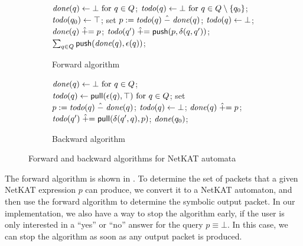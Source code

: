 \documentclass[acmsmall,dvipsnames,nonacm]{acmart}
\begin{document}
\newcommand{\pluseq}{\mathrel{\nf{+}}=}
\begin{figure}
    \begin{subfigure}[t]{0.49\textwidth}
    \begin{algorithmic}
    \State $\textit{done}(q) \gets \bot \text{ for } q \in Q$;
    \State $\textit{todo}(q) \gets \bot \text{ for } q \in Q \setminus \{q_0\}$;
    \State $\textit{todo}(q_0) \gets \top$;
        \State set $p := \textit{todo}(q) \mathrel{\hat{-}} \textit{done}(q)$;
        \State $\textit{todo}(q) \gets \bot$;
        \State $\doneR(q) \pluseq p$;
            \State $\todoR(q') \pluseq \mathsf{push}(p,\delta(q,q'))$;
          \EndFor
    \EndWhile
    \State
    \Return $\sum_{q \in Q} \mathsf{push}(\textit{done}(q), \epsilon(q))$;
    \end{algorithmic}
    \caption{Forward algorithm}
    \end{subfigure}
    \begin{subfigure}[t]{0.49\textwidth}
    \begin{algorithmic}
    \State $\textit{done}(q) \gets \bot \text{ for } q \in Q$;
    \State $\textit{todo}(q) \gets \mathsf{pull}(\epsilon(q), \top) \text{ for } q \in Q$;
    \State
        \State set $p := \textit{todo}(q) \mathrel{\hat{-}} \textit{done}(q)$;
        \State $\textit{todo}(q) \gets \bot$;
        \State $\doneR(q) \pluseq p$;
            \State $\todoR(q') \pluseq \mathsf{pull}(\delta(q',q), p)$;
          \EndFor
    \EndWhile
    \State
    \Return $\textit{done}(q_0)$;
    \end{algorithmic}
    \caption{Backward algorithm}
    \end{subfigure}
    \caption{Forward and backward algorithms for NetKAT automata}
    \label{fig:forward}
    \label{fig:backward}
\end{figure}

The forward algorithm is shown in .  To determine
the set of packets that a given NetKAT expression $p$ can produce, we
convert it to a NetKAT automaton, and then use the forward algorithm
to determine the symbolic output packet.  In our implementation, we
also have a way to stop the algorithm early, if the user is only
interested in a ``yes'' or ``no'' answer for the query $p \equiv
\bot$. In this case, we can stop the algorithm as soon as any output
packet is produced.
\end{document}
